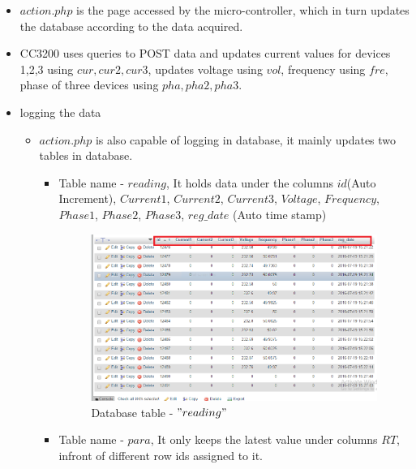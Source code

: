 \documentclass[a4paper,12pt,oneside]{book}
\begin{document}
\begin{itemize}
	\setlength\itemsep{0.2cm}
	
		\item{$action.php$ is the page accessed by the micro-controller, which in turn updates the database according to the data acquired.}
		\item{CC3200 uses queries to POST data and updates current values for devices 1,2,3 using $cur,cur2,cur3$, updates voltage using $vol$, frequency using $fre$,  phase of three devices using $pha,pha2,pha3$.}

	\item{logging the data}
	\begin{itemize}
		\item {$action.php$ is also capable of logging in database, it mainly  
			updates two tables in database.}
		\begin{itemize}
			\item {Table name - $reading$, It holds data under the columns $id$(Auto Increment), $Current1$, $Current2$, $Current3$, $Voltage$, $Frequency$, $Phase1$, $Phase2$, $Phase3 $, $reg\_date$ (Auto time stamp) }
			\begin{figure}[H]
				\centering
				\includegraphics[width=15cm]{reading.png}
				\caption{Database table - $"reading"$}
				\label{1}
			\end{figure}
			
			\item{Table name - $para$, It only keeps the latest value under columns $RT$, infront of different row ids assigned to it. }
			

\end{itemize}
\end{itemize}
\end{itemize}
\end{document}
